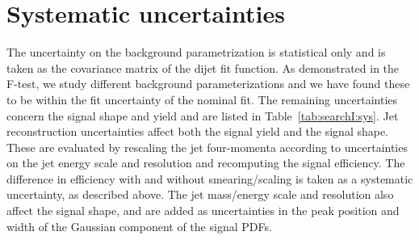 \section{Systematic uncertainties}
\label{sec:searchI:sys}
The uncertainty on the background parametrization is statistical only and is taken as the covariance matrix of the dijet fit function. As demonstrated in the F-test, we study different background parameterizations and we have found these to be within the fit uncertainty of the nominal fit. The remaining uncertainties concern the signal shape and yield and are listed in Table~\ref{tab:searchI:sys}. Jet reconstruction uncertainties affect both the signal yield and the signal shape. These are evaluated by rescaling the jet four-momenta according to uncertainties on the jet energy scale and resolution and recomputing the signal efficiency. The difference in efficiency with and without smearing/scaling is taken as a systematic uncertainty, as described above.
The jet mass/energy scale and resolution also affect the signal shape, and are added as uncertainties in the peak position and width of the Gaussian component of the signal PDFs.
